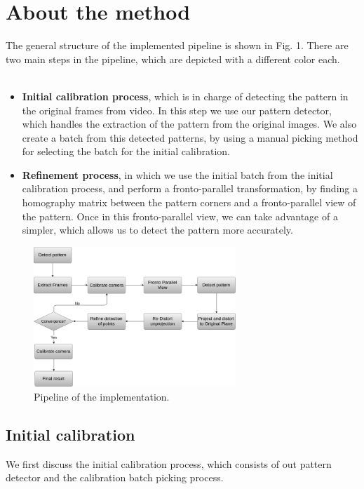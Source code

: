 \documentclass[journal]{IEEEtran}
\begin{document}
\section{About the method}
The general structure of the implemented pipeline is shown in Fig. 1. There are two main steps in the pipeline, which are depicted with a different color each.
\\
\\
\begin{itemize}
  \item \textbf{Initial calibration process}, which is in charge of detecting the pattern in the original frames from video. In this step we use our pattern detector, which handles the extraction of the pattern from the original images. We also create a batch from this detected patterns, by using a manual picking method for selecting the batch for the initial calibration.
  \item \textbf{Refinement process}, in which we use the initial batch from the initial calibration process, and perform a fronto-parallel transformation, by finding a homography matrix between the pattern corners and a fronto-parallel view of the pattern. Once in this fronto-parallel view, we can take advantage of a simpler, which allows us to detect the pattern more accurately.
\end{itemize}

\begin{figure}[H]
\centering
\includegraphics[width=3.0in]{_img/img_report4_pipeline.png}
\caption{Pipeline of the implementation.}
\end{figure}

\subsection{ \textbf{ Initial calibration } }

We first discuss the initial calibration process, which consists of out pattern detector and the calibration batch picking process.
\end{document}
